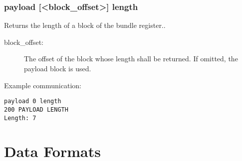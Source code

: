 \documentclass[12pt, a4paper]{scrartcl}
\begin{document}
\subsubsection*{payload [<block\_offset>] length}
Returns the length of a block of the bundle register..
\begin{description}
\item[block\_offset:] The offset of the block whose length shall be returned.
	If omitted, the payload block is used.
\end{description}
Example communication:\\
\makebox[\textwidth]{\hrulefill}
\begin{verbatim}
payload 0 length
200 PAYLOAD LENGTH
Length: 7
\end{verbatim}
\makebox[\textwidth]{\hrulefill}
\section{Data Formats}
\label{sec:formats}
\end{document}
